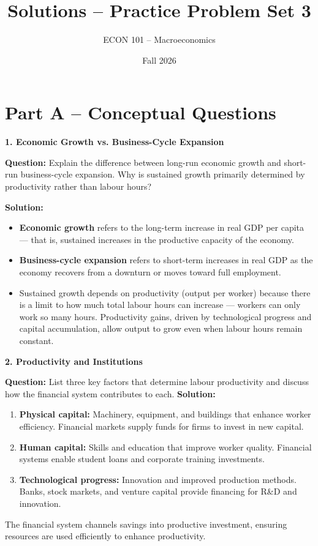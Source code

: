 \documentclass[12pt]{article}
\title{Solutions -- Practice Problem Set 3}
\author{ECON 101 -- Macroeconomics}
\date{Fall 2026}
\begin{document}
\maketitle


\section*{Part A – Conceptual Questions}

\textbf{1. Economic Growth vs. Business-Cycle Expansion}

\textbf{Question:}  
Explain the difference between long-run economic growth and short-run business-cycle expansion. Why is sustained growth primarily determined by productivity rather than labour hours?

\textbf{Solution:}  
\begin{itemize}
\item \textbf{Economic growth} refers to the long-term increase in real GDP per capita — that is, sustained increases in the productive capacity of the economy.
\item \textbf{Business-cycle expansion} refers to short-term increases in real GDP as the economy recovers from a downturn or moves toward full employment.
\item Sustained growth depends on productivity (output per worker) because there is a limit to how much total labour hours can increase — workers can only work so many hours. Productivity gains, driven by technological progress and capital accumulation, allow output to grow even when labour hours remain constant.
\end{itemize}



\textbf{2. Productivity and Institutions}

\textbf{Question:}  
List three key factors that determine labour productivity and discuss how the financial system contributes to each.
\newpage
\textbf{Solution:}  
\begin{enumerate}
    \item \textbf{Physical capital:} Machinery, equipment, and buildings that enhance worker efficiency. Financial markets supply funds for firms to invest in new capital.
    \item \textbf{Human capital:} Skills and education that improve worker quality. Financial systems enable student loans and corporate training investments.
    \item \textbf{Technological progress:} Innovation and improved production methods. Banks, stock markets, and venture capital provide financing for R\&D and innovation.
\end{enumerate}
The financial system channels savings into productive investment, ensuring resources are used efficiently to enhance productivity.
\end{document}
